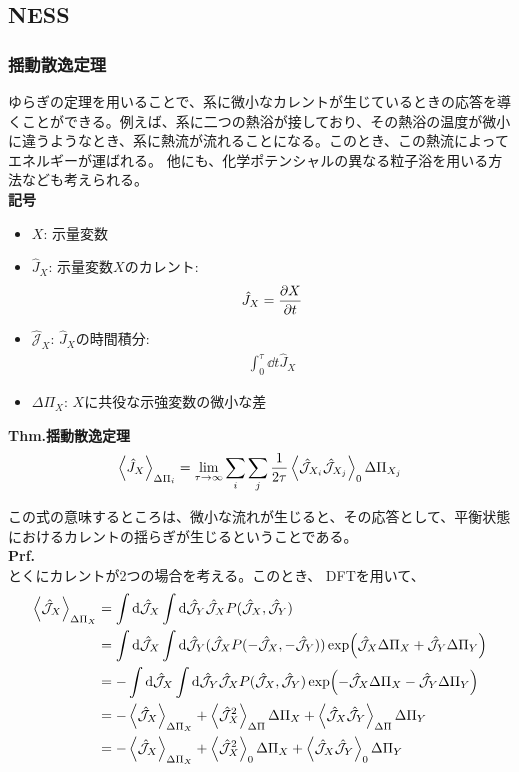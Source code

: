 \documentclass[a4paper,11pt]{jsarticle}
\numberwithin{equation}{section}
\begin{document}
\subsection{NESS}
\subsubsection{揺動散逸定理}
ゆらぎの定理を用いることで、系に微小なカレントが生じているときの応答を導くことができる。例えば、系に二つの熱浴が接しており、その熱浴の温度が微小に違うようなとき、系に熱流が流れることになる。このとき、この熱流によってエネルギーが運ばれる。
他にも、化学ポテンシャルの異なる粒子浴を用いる方法なども考えられる。\\
\textbf{記号}\\
\begin{itemize}
  \item $X$: 示量変数
  \item $\hat{J}_X$: 示量変数$X$のカレント:
  \begin{align}
    \hat{J}_X = \pdv{X}{t}
  \end{align}
  \item $\hat{\mathcal{J}}_X$: $\hat{J}_X$の時間積分:
  \begin{align}
    \int_{0}^{\tau}\dd{t}\hat{J}_X
  \end{align}
  \item $\Delta \Pi_X$: $X$に共役な示強変数の微小な差
\end{itemize}
\begin{itembox}[l]{\textbf{Thm.揺動散逸定理}}
  \begin{align}
    \ev{\hat{J}_X }_{\Delta \Pi_i} = \lim_{\tau \to \infty}\sum_{i} \sum_{j} \frac{1}{2\tau}\ev{\hat{\mathcal{J}}_{X_{i}} \hat{\mathcal{J}}_{X_{j}}}_{0} \Delta \Pi_{X_j}
  \end{align}
\end{itembox}
この式の意味するところは、微小な流れが生じると、その応答として、平衡状態におけるカレントの揺らぎが生じるということである。\\
\textbf{Prf.}\\
とくにカレントが2つの場合を考える。このとき、  DFTを用いて、
\begin{align}
  \ev{\hat{\mathcal{J}}_X}_{\Delta\Pi_X} &= \int \dd \hat{\mathcal{J}}_X \int \dd \hat{\mathcal{J}}_Y \hat{\mathcal{J}}_X P(\hat{\mathcal{J}}_X, \hat{\mathcal{J}}_Y)\\
  &= \int \dd \hat{\mathcal{J}}_X \int \dd \hat{\mathcal{J}}_Y (\hat{\mathcal{J}}_X P(-\hat{\mathcal{J}}_X, -\hat{\mathcal{J}}_Y))\exp(\hat{\mathcal{J}}_X \Delta \Pi_X + \hat{\mathcal{J}}_Y \Delta \Pi_Y)\\
  &= -\int \dd \hat{\mathcal{J}}_X \int \dd \hat{\mathcal{J}}_Y \hat{\mathcal{J}}_X P(\hat{\mathcal{J}}_X, \hat{\mathcal{J}}_Y)\exp(-\hat{\mathcal{J}}_X \Delta \Pi_X - \hat{\mathcal{J}}_Y \Delta \Pi_Y)\\
  &= -\ev{\hat{\mathcal{J}}_X }_{\Delta \Pi_X} + \ev{\hat{\mathcal{J}}_X^2}_{\Delta \Pi} \Delta \Pi_X + \ev{\hat{\mathcal{J}}_X \hat{\mathcal{J}}_Y}_{\Delta \Pi} \Delta \Pi_Y\\
  &= -\ev{\hat{\mathcal{J}}_X }_{\Delta \Pi_X} + \ev{\hat{\mathcal{J}}_X^2}_{0} \Delta \Pi_X + \ev{\hat{\mathcal{J}}_X \hat{\mathcal{J}}_Y}_{0} \Delta \Pi_Y
\end{align}
\end{document}
